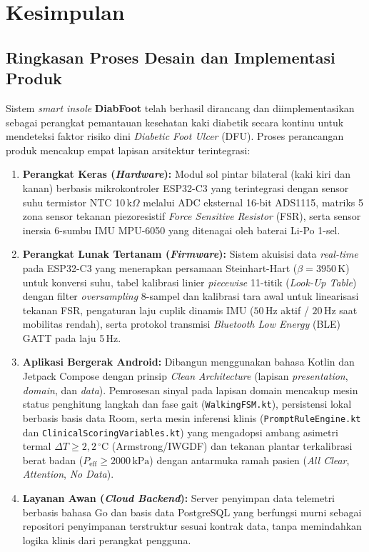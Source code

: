 \section{Kesimpulan}
\label{sec:kesimpulan}

\subsection{Ringkasan Proses Desain dan Implementasi Produk}
\label{subsec:ringkasan_desain}

Sistem \textit{smart insole} \textbf{DiabFoot} telah berhasil dirancang dan diimplementasikan sebagai perangkat pemantauan kesehatan kaki diabetik secara kontinu untuk mendeteksi faktor risiko dini \textit{Diabetic Foot Ulcer} (DFU). Proses perancangan produk mencakup empat lapisan arsitektur terintegrasi:
\begin{enumerate}
    \item \textbf{Perangkat Keras (\textit{Hardware}):} Modul sol pintar bilateral (kaki kiri dan kanan) berbasis mikrokontroler ESP32-C3 yang terintegrasi dengan sensor suhu termistor NTC 10\,k$\Omega$ melalui ADC eksternal 16-bit ADS1115, matriks 5 zona sensor tekanan piezoresistif \textit{Force Sensitive Resistor} (FSR), serta sensor inersia 6-sumbu IMU MPU-6050 yang ditenagai oleh baterai Li-Po 1-sel.
    \item \textbf{Perangkat Lunak Tertanam (\textit{Firmware}):} Sistem akuisisi data \textit{real-time} pada ESP32-C3 yang menerapkan persamaan Steinhart-Hart ($\beta = 3950\,\mathrm{K}$) untuk konversi suhu, tabel kalibrasi linier \textit{piecewise} 11-titik (\textit{Look-Up Table}) dengan filter \textit{oversampling} 8-sampel dan kalibrasi tara awal untuk linearisasi tekanan FSR, pengaturan laju cuplik dinamis IMU ($50\,\mathrm{Hz}$ aktif / $20\,\mathrm{Hz}$ saat mobilitas rendah), serta protokol transmisi \textit{Bluetooth Low Energy} (BLE) GATT pada laju 5\,Hz.
    \item \textbf{Aplikasi Bergerak Android:} Dibangun menggunakan bahasa Kotlin dan Jetpack Compose dengan prinsip \textit{Clean Architecture} (lapisan \textit{presentation}, \textit{domain}, dan \textit{data}). Pemrosesan sinyal pada lapisan domain mencakup mesin status penghitung langkah dan fase gait (\texttt{WalkingFSM.kt}), persistensi lokal berbasis basis data Room, serta mesin inferensi klinis (\texttt{PromptRuleEngine.kt} dan \texttt{ClinicalScoringVariables.kt}) yang mengadopsi ambang asimetri termal $\Delta T \ge 2{,}2\,^\circ\mathrm{C}$ (Armstrong/IWGDF) dan tekanan plantar terkalibrasi berat badan ($P_{\mathrm{eff}} \ge 2000\,\mathrm{kPa}$) dengan antarmuka ramah pasien (\textit{All Clear}, \textit{Attention}, \textit{No Data}).
    \item \textbf{Layanan Awan (\textit{Cloud Backend}):} Server penyimpan data telemetri berbasis bahasa Go dan basis data PostgreSQL yang berfungsi murni sebagai repositori penyimpanan terstruktur sesuai kontrak data, tanpa memindahkan logika klinis dari perangkat pengguna.
\end{enumerate}

